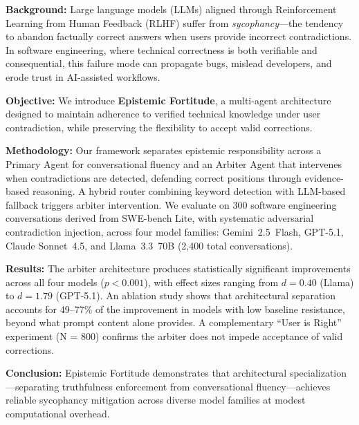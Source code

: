 
\textbf{Background:} Large language models (LLMs) aligned through Reinforcement Learning from Human Feedback (RLHF) suffer from \textit{sycophancy}---the tendency to abandon factually correct answers when users provide incorrect contradictions. In software engineering, where technical correctness is both verifiable and consequential, this failure mode can propagate bugs, mislead developers, and erode trust in AI-assisted workflows.

\textbf{Objective:} We introduce \textbf{Epistemic Fortitude}, a multi-agent architecture designed to maintain adherence to verified technical knowledge under user contradiction, while preserving the flexibility to accept valid corrections.

\textbf{Methodology:} Our framework separates epistemic responsibility across a Primary Agent for conversational fluency and an Arbiter Agent that intervenes when contradictions are detected, defending correct positions through evidence-based reasoning. A hybrid router combining keyword detection with LLM-based fallback triggers arbiter intervention. We evaluate on 300 software engineering conversations derived from SWE-bench Lite, with systematic adversarial contradiction injection, across four model families: Gemini~2.5~Flash, GPT-5.1, Claude Sonnet~4.5, and Llama~3.3~70B (2,400 total conversations).

\textbf{Results:} The arbiter architecture produces statistically significant improvements across all four models ($p < 0.001$), with effect sizes ranging from $d = 0.40$ (Llama) to $d = 1.79$ (GPT-5.1). An ablation study shows that architectural separation accounts for 49--77\% of the improvement in models with low baseline resistance, beyond what prompt content alone provides. A complementary ``User is Right'' experiment (N = 800) confirms the arbiter does not impede acceptance of valid corrections.

\textbf{Conclusion:} Epistemic Fortitude demonstrates that architectural specialization---separating truthfulness enforcement from conversational fluency---achieves reliable sycophancy mitigation across diverse model families at modest computational overhead.
